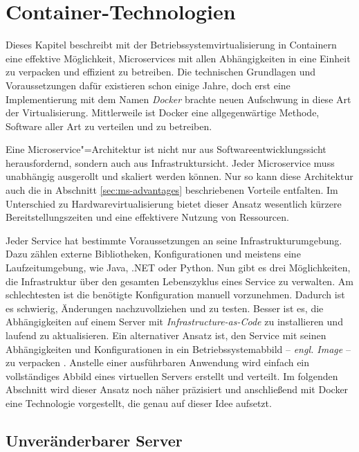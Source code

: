 \chapter{Container-Technologien}
\label{chap:containers}

Dieses Kapitel beschreibt mit der Betriebssystemvirtualisierung in Containern eine effektive Möglichkeit, Microservices mit allen Abhängigkeiten in eine Einheit zu verpacken und effizient zu betreiben. Die technischen Grundlagen und Voraussetzungen dafür existieren schon einige Jahre, doch erst eine Implementierung mit dem Namen \textit{Docker} brachte neuen Aufschwung in diese Art der Virtualisierung. Mittlerweile ist Docker eine allgegenwärtige Methode, Software aller Art zu verteilen und zu betreiben.

Eine Microservice"=Architektur ist nicht nur aus Softwareentwicklungssicht herausfordernd, sondern auch aus Infrastruktursicht. Jeder Microservice muss unabhängig ausgerollt und skaliert werden können. Nur so kann diese Architektur auch die in Abschnitt \ref{sec:ms-advantages} beschriebenen Vorteile entfalten. Im Unterschied zu Hardwarevirtualisierung bietet dieser Ansatz wesentlich kürzere Bereitstellungszeiten und eine effektivere Nutzung von Ressourcen.

Jeder Service hat bestimmte Voraussetzungen an seine Infrastrukturumgebung. Dazu zählen externe Bibliotheken, Konfigurationen und meistens eine Laufzeitumgebung, wie \zB Java, .NET oder Python. Nun gibt es drei Möglichkeiten, die Infrastruktur über den gesamten Lebenszyklus eines Service zu verwalten. Am schlechtesten ist die benötigte Konfiguration manuell vorzunehmen. Dadurch ist es schwierig, Änderungen nachzuvollziehen und zu testen. Besser ist es, die Abhängigkeiten auf einem Server mit \textit{Infrastructure-as-Code} zu installieren und laufend zu aktualisieren. Ein alternativer Ansatz ist, den Service mit seinen Abhängigkeiten und Konfigurationen in ein Betriebssystemabbild -- \textit{engl. Image} -- zu verpacken \cite[113]{newman2015building}. Anstelle einer ausführbaren Anwendung wird einfach ein vollständiges Abbild eines virtuellen Servers erstellt und verteilt. Im folgenden Abschnitt wird dieser Ansatz noch näher präzisiert und anschließend mit Docker eine Technologie vorgestellt, die genau auf dieser Idee aufsetzt.

\section{Unveränderbarer Server}
\label{sec:immutable-server}

